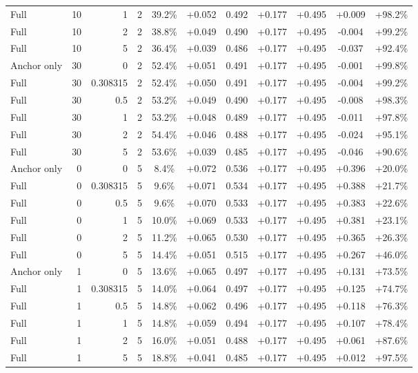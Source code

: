 \begin{table}[htbp]
\begin{tabular}{lrrrccccccc}
Full & 10 & 1 & 2 & 39.2\% & +0.052 & 0.492 & +0.177 & +0.495 & +0.009 & +98.2\% \\
Full & 10 & 2 & 2 & 38.8\% & +0.049 & 0.490 & +0.177 & +0.495 & -0.004 & +99.2\% \\
Full & 10 & 5 & 2 & 36.4\% & +0.039 & 0.486 & +0.177 & +0.495 & -0.037 & +92.4\% \\
Anchor only & 30 & 0 & 2 & 52.4\% & +0.051 & 0.491 & +0.177 & +0.495 & -0.001 & +99.8\% \\
Full & 30 & 0.308315 & 2 & 52.4\% & +0.050 & 0.491 & +0.177 & +0.495 & -0.004 & +99.2\% \\
Full & 30 & 0.5 & 2 & 53.2\% & +0.049 & 0.490 & +0.177 & +0.495 & -0.008 & +98.3\% \\
Full & 30 & 1 & 2 & 53.2\% & +0.048 & 0.489 & +0.177 & +0.495 & -0.011 & +97.8\% \\
Full & 30 & 2 & 2 & 54.4\% & +0.046 & 0.488 & +0.177 & +0.495 & -0.024 & +95.1\% \\
Full & 30 & 5 & 2 & 53.6\% & +0.039 & 0.485 & +0.177 & +0.495 & -0.046 & +90.6\% \\
Anchor only & 0 & 0 & 5 & 8.4\% & +0.072 & 0.536 & +0.177 & +0.495 & +0.396 & +20.0\% \\
Full & 0 & 0.308315 & 5 & 9.6\% & +0.071 & 0.534 & +0.177 & +0.495 & +0.388 & +21.7\% \\
Full & 0 & 0.5 & 5 & 9.6\% & +0.070 & 0.533 & +0.177 & +0.495 & +0.383 & +22.6\% \\
Full & 0 & 1 & 5 & 10.0\% & +0.069 & 0.533 & +0.177 & +0.495 & +0.381 & +23.1\% \\
Full & 0 & 2 & 5 & 11.2\% & +0.065 & 0.530 & +0.177 & +0.495 & +0.365 & +26.3\% \\
Full & 0 & 5 & 5 & 14.4\% & +0.051 & 0.515 & +0.177 & +0.495 & +0.267 & +46.0\% \\
Anchor only & 1 & 0 & 5 & 13.6\% & +0.065 & 0.497 & +0.177 & +0.495 & +0.131 & +73.5\% \\
Full & 1 & 0.308315 & 5 & 14.0\% & +0.064 & 0.497 & +0.177 & +0.495 & +0.125 & +74.7\% \\
Full & 1 & 0.5 & 5 & 14.8\% & +0.062 & 0.496 & +0.177 & +0.495 & +0.118 & +76.3\% \\
Full & 1 & 1 & 5 & 14.8\% & +0.059 & 0.494 & +0.177 & +0.495 & +0.107 & +78.4\% \\
Full & 1 & 2 & 5 & 16.0\% & +0.051 & 0.488 & +0.177 & +0.495 & +0.061 & +87.6\% \\
Full & 1 & 5 & 5 & 18.8\% & +0.041 & 0.485 & +0.177 & +0.495 & +0.012 & +97.5\% \\

\end{tabular}
\end{table}
